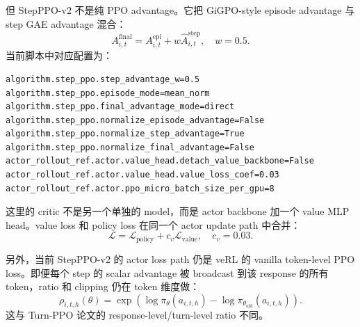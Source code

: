 \documentclass[10pt]{ctexart}
\begin{document}
但 StepPPO-v2 不是纯 PPO advantage。它把 GiGPO-style episode advantage 与 step GAE advantage 混合：
\[
A^{\mathrm{final}}_{i,t}
= A^{\mathrm{epi}}_{i,t}+w\widehat A^{\mathrm{step}}_{i,t},
\quad w=0.5.
\]
当前脚本中对应配置为：
\begin{Verbatim}[breaklines=true,breakanywhere=true]
algorithm.step_ppo.step_advantage_w=0.5
algorithm.step_ppo.episode_mode=mean_norm
algorithm.step_ppo.final_advantage_mode=direct
algorithm.step_ppo.normalize_episode_advantage=False
algorithm.step_ppo.normalize_step_advantage=True
algorithm.step_ppo.normalize_final_advantage=False
actor_rollout_ref.actor.value_head.detach_value_backbone=False
actor_rollout_ref.actor.value_head.value_loss_coef=0.03
actor_rollout_ref.actor.ppo_micro_batch_size_per_gpu=8
\end{Verbatim}

这里的 critic 不是另一个单独的 model，而是 actor backbone 加一个 value MLP head。value loss 和 policy loss 在同一个 actor update path 中合并：
\[
\mathcal{L}=\mathcal{L}_{\mathrm{policy}}+c_v\mathcal{L}_{\mathrm{value}},
\quad c_v=0.03.
\]

另外，当前 StepPPO-v2 的 actor loss path 仍是 veRL 的 vanilla token-level PPO loss。即便每个 step 的 scalar advantage 被 broadcast 到该 response 的所有 token，ratio 和 clipping 仍在 token 维度做：
\[
\rho_{i,t,h}(\theta)
=\exp\left(\log\pi_\theta(a_{i,t,h})-\log\pi_{\theta_{\mathrm{old}}}(a_{i,t,h})\right).
\]
这与 Turn-PPO 论文的 response-level/turn-level ratio 不同。
\end{document}
